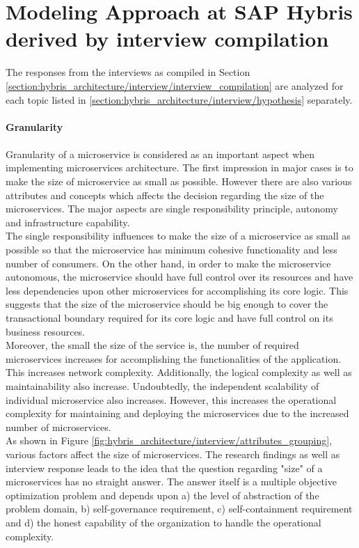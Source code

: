  \section{Modeling Approach at SAP Hybris derived by interview compilation}\label{section:hybris_architecture/interview_summary}
 The responses from the interviews as compiled in Section \ref{section:hybris_architecture/interview/interview_compilation} are analyzed for each topic listed in \ref{section:hybris_architecture/interview/hypothesis} separately.
 \\
 \\
 \textbf{Granularity}
 \\
 \\
Granularity of a microservice is considered as an important aspect when implementing microservices architecture. The first impression in major cases is to make the size of microservice as small as possible. However there are also various attributes and concepts which affects the decision regarding the size of the microservices. The major aspects are single responsibility principle, autonomy and infrastructure capability.
\\
The single responsibility influences to make the size of a microservice as small as possible so that the microservice has minimum cohesive functionality and less number of consumers. On the other hand, in order to make the microservice autonomous, the microservice should have full control over its resources and have less dependencies upon other microservices for accomplishing its core logic. This suggests that the size of the microservice should be big enough to cover the transactional boundary required for its core logic and have full control on its business resources.
\\
Moreover, the small the size of the service is, the number of required microservices increases for accomplishing the functionalities of the application. This increases network complexity. Additionally, the logical complexity as well as maintainability also increase. Undoubtedly, the independent scalability of individual microservice also increases. However, this increases the operational complexity for maintaining and deploying the microservices due to the increased number of microservices.
\\
As shown in Figure \ref{fig:hybris_architecture/interview/attributes_grouping}, various factors affect the size of microservices.
The research findings as well as interview response leads to the idea that the question regarding "size" of a microservices has no straight answer. The answer itself is a multiple objective optimization problem and depends upon a) the level of abstraction of the problem domain, b) self-governance requirement, c) self-containment requirement and d) the honest capability of the organization to handle the operational complexity.
